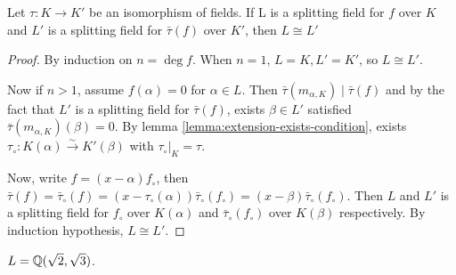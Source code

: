 \begin{theorem} \label{thm:two-splitting-field-are-isom}
  Let $\tau: K \to K'$ be an isomorphism of fields.
  If L is a splitting field for $f$ over $K$ and $L'$ is a splitting field for $\bar\tau(f)$
  over $K'$, then $L \cong L'$

\begin{proof}
  By induction on $n = \deg f$. When $n = 1$, $L = K, L' = K'$, so $L \cong L'$.

  Now if $n > 1$, assume $f(\alpha) = 0$ for $\alpha \in L$. Then $\bar\tau(m_{\alpha, K}) \mid \bar\tau(f)$
  and by the fact that $L'$ is a splitting field for $\bar\tau(f)$, exists $\beta \in L'$ satisfied
  $\bar\tau(m_{\alpha, K})(\beta) = 0$. By lemma \ref{lemma:extension-exists-condition}, exists $\tau_{\circ}:
  K(\alpha) \xrightarrow\sim K'(\beta)$ with $\tau_\circ \big|_K = \tau$.

  Now, write $f = (x - \alpha) f_\circ$, then $\bar\tau(f) = \bar\tau_\circ(f) = (x - \tau_\circ(\alpha))
  \bar\tau_\circ(f_\circ) = (x - \beta) \bar\tau_\circ(f_\circ)$. Then $L$ and $L'$ is a splitting
  field for $f_{\circ}$ over $K(\alpha)$ and $\bar\tau_\circ(f_\circ)$ over $K(\beta)$ respectively.
  By induction hypothesis, $L \cong L'$.
\end{proof}
\end{theorem}

\begin{example}
  $L = \mathbb{Q}(\sqrt{2}, \sqrt{3})$.
\end{example}
